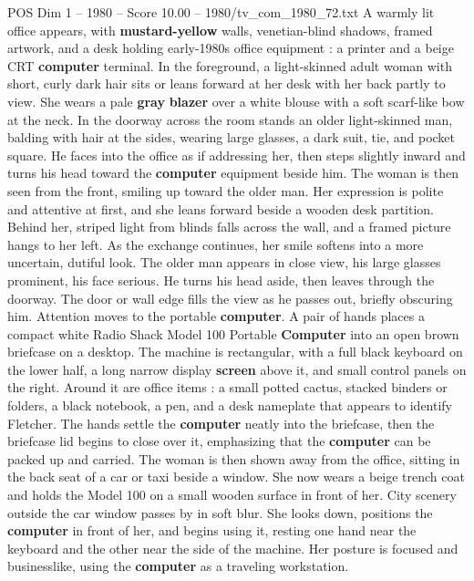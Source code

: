 \begin{textsample}{POS Dim 1 – 1980 – Score 10.00 – 1980/tv\_com\_1980\_72.txt}  \label{ex:f1_pos_052}
A warmly lit office appears, with \textbf{mustard-yellow} walls, venetian-blind shadows, framed artwork, and a desk holding early-1980s office equipment : a printer and a beige CRT \textbf{computer} terminal.
In the foreground, a light-skinned adult woman with short, curly dark hair sits or leans forward at her desk with her back partly to view.
She wears a pale \textbf{gray} \textbf{blazer} over a white blouse with a soft scarf-like bow at the neck.
In the doorway across the room stands an older light-skinned man, balding with hair at the sides, wearing large glasses, a dark suit, tie, and pocket square.
He faces into the office as if addressing her, then steps slightly inward and turns his head toward the \textbf{computer} equipment beside him.
The woman is then seen from the front, smiling up toward the older man.
Her expression is polite and attentive at first, and she leans forward beside a wooden desk partition.
Behind her, striped light from blinds falls across the wall, and a framed picture hangs to her left.
As the exchange continues, her smile softens into a more uncertain, dutiful look.
The older man appears in close view, his large glasses prominent, his face serious.
He turns his head aside, then leaves through the doorway.
The door or wall edge fills the view as he passes out, briefly obscuring him.
Attention moves to the portable \textbf{computer}.
A pair of hands places a compact white Radio Shack Model 100 Portable \textbf{Computer} into an open brown briefcase on a desktop.
The machine is rectangular, with a full black keyboard on the lower half, a long narrow display \textbf{screen} above it, and small control panels on the right.
Around it are office items : a small potted cactus, stacked binders or folders, a black notebook, a pen, and a desk nameplate that appears to identify Fletcher.
The hands settle the \textbf{computer} neatly into the briefcase, then the briefcase lid begins to close over it, emphasizing that the \textbf{computer} can be packed up and carried.
The woman is then shown away from the office, sitting in the back seat of a car or taxi beside a window.
She now wears a beige trench coat and holds the Model 100 on a small wooden surface in front of her.
City scenery outside the car window passes by in soft blur.
She looks down, positions the \textbf{computer} in front of her, and begins using it, resting one hand near the keyboard and the other near the side of the machine.
Her posture is focused and businesslike, using the \textbf{computer} as a traveling workstation.

\end{textsample}
